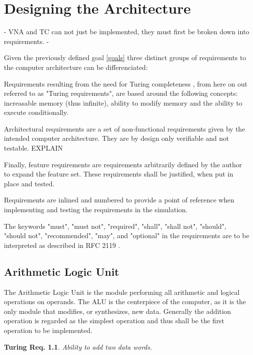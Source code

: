 \chapter{Designing the Architecture}
- VNA and TC can not just be implemented, they must first be broken down into requirements. 
-

Given the previously defined goal \ref{goals} three distinct groups of requirements to the computer architecture can be differenciated: 

Requirements resulting from the need for Turing completeness , from here on out referred to as "Turing requirements", are based around the following concepts: increasable memory (thus infinite), ability to modify memory and the ability to execute conditionally. 

Architectural requirements are a set of non-functional requirements given by the intended computer architecture. They are by design only verifiable and not testable. EXPLAIN

Finally, feature requirements are requirements arbitrarily defined by the author to expand the feature set. These requirements shall be justified, when put in place and tested.

Requirements are inlined and numbered to provide a point of reference when implementing and testing the requirements in the simulation. 

\newtheorem{turing-requirement}{Turing Req.}[section]
\newtheorem{arch-requirement}{Arch. Req.}[section]
\newtheorem{feat-requirement}{Feat. Req.}[section]

The keywords "must", "must not", "required", "shall", "shall not", "should", "should not", "recommended",  "may", and "optional" in the requirements are to be interpreted as described in RFC 2119 \cite{rfc2119}.


\section{Arithmetic Logic Unit}
The Arithmetic Logic Unit is the module performing all arithmetic and logical operations on operands. The ALU is the centerpiece of the computer, as it is the only module that modifies, or synthesizes, new data. Generally the addition operation is regarded as the simplest operation and thus shall be the first operation to be implemented.

\begin{turing-requirement}
  Ability to add two data words.
\end{turing-requirement}

